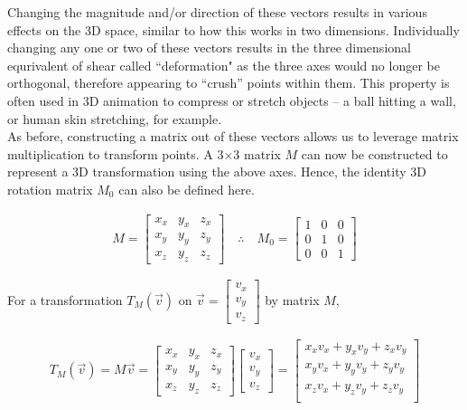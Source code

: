 \documentclass[12pt, a4paper]{article}
\begin{document}
Changing the magnitude and/or direction of these vectors results in various
effects on the 3D space, similar to how this works in two dimensions.
Individually changing any one or two of these vectors results in the three
dimensional equrivalent of shear called ``deformation" as the three axes would
no longer be orthogonal, therefore appearing to ``crush'' points within them.
This property is often used in 3D animation to compress or stretch objects -- a
ball hitting a wall, or human skin stretching, for example. \\

As before, constructing a matrix out of these vectors allows us to leverage
matrix multiplication to transform points. A 3$\times$3 matrix $M$ can now be
constructed to represent a 3D transformation using the above axes. Hence, the
identity 3D rotation matrix $M_0$ can also be defined here.

\begin{align*}
    M = \begin{bmatrix}
            {x}_x & {y}_x & {z}_x \\
            {x}_y & {y}_y & {z}_y \\
            {x}_z & {y}_z & {z}_z
        \end{bmatrix} \quad\therefore\quad M_0 = \begin{bmatrix}
                                                     1 & 0 & 0 \\
                                                     0 & 1 & 0 \\
                                                     0 & 0 & 1
                                                 \end{bmatrix}
\end{align*}

For a transformation $T_M(\vec{v})$ on $\vec{v} = \begin{bmatrix}
        v_x \\
        v_y \\
        v_z \end{bmatrix}$ by matrix $M$,

\begin{align*}
    T_M(\vec{v}) = M\vec{v} = \begin{bmatrix}
                                  {x}_x & {y}_x & {z}_x \\
                                  {x}_y & {y}_y & {z}_y \\
                                  {x}_z & {y}_z & {z}_z
                              \end{bmatrix}
    \begin{bmatrix}
        v_x \\
        v_y \\
        v_z
    \end{bmatrix}
    =
    \begin{bmatrix}
        x_x v_x + y_x v_y + z_x v_y \\
        x_y v_x + y_y v_y + z_y v_y \\
        x_z v_x + y_z v_y + z_z v_y \\
    \end{bmatrix}
\end{align*}
\end{document}

